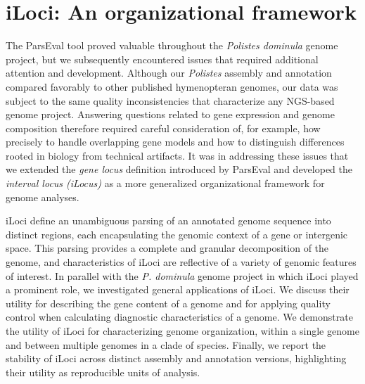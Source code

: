 \section{iLoci: An organizational framework}

The ParsEval tool proved valuable throughout the \textit{Polistes dominula} genome project, but we subsequently encountered issues that required additional attention and development.
Although our \textit{Polistes} assembly and annotation compared favorably to other published hymenopteran genomes, our data was subject to the same quality inconsistencies that characterize any NGS-based genome project.
Answering questions related to gene expression and genome composition therefore required careful consideration of, for example, how precisely to handle overlapping gene models and how to distinguish differences rooted in biology from technical artifacts.
It was in addressing these issues that we extended the \textit{gene locus} definition introduced by ParsEval and developed the \textit{interval locus (iLocus)} as a more generalized organizational framework for genome analyses.

iLoci define an unambiguous parsing of an annotated genome sequence into distinct regions, each encapsulating the genomic context of a gene or intergenic space.
This parsing provides a complete and granular decomposition of the genome, and characteristics of iLoci are reflective of a variety of genomic features of interest.
In parallel with the \textit{P. dominula} genome project in which iLoci played a prominent role, we investigated general applications of iLoci.
We discuss their utility for describing the gene content of a genome and for applying quality control when calculating diagnostic characteristics of a genome.
We demonstrate the utility of iLoci for characterizing genome organization, within a single genome and between multiple genomes in a clade of species.
Finally, we report the stability of iLoci across distinct assembly and annotation versions, highlighting their utility as reproducible units of analysis.

